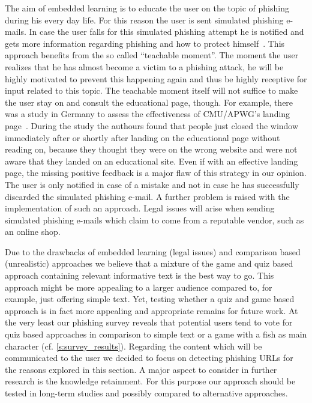 \begin{description}[leftmargin=0cm]
	\item[Emdedded Learning] The aim of embedded learning is to educate the user on the topic of phishing during his every day life.
 For this reason the user is sent simulated phishing e-mails.
 In case the user falls for this simulated phishing attempt he is notified and gets more information regarding phishing and how to protect himself~\cite{embedded2011jansson, kumaraguru2009phishguru}. 
This approach benefits from the so called ``teachable moment''. 
The moment the user realizes that he has almost become a victim to a phishing attack, he will be highly motivated to prevent this happening again and thus be highly receptive for input related to this topic.
 The teachable moment itself will not suffice to make the user stay on and consult the educational page, though.
 For example, there was a study in Germany to assess the effectiveness of CMU/APWG's landing page~\cite{TUD-CS-2013-0167}. 
 During the study the authours found that people just closed the window immediately after or shortly after landing on the educational page without reading on,  because they thought they were on the wrong website and were not aware that they landed on an educational site.
 Even if with an effective landing page, the missing positive feedback is a major flaw of this strategy in our opinion.
 The user is only notified in case of a mistake and not in case he has successfully discarded the simulated phishing e-mail.
 A further problem is raised with the implementation of such an approach.
 Legal issues will arise when sending simulated phishing e-mails which claim to come from a reputable vendor, such as an online shop.

\end{description}

Due to the drawbacks of embedded learning (legal issues) and comparison based (unrealistic) approaches we believe that a mixture of the game and quiz based approach containing relevant informative text is the best way to go.
This approach might be more appealing to a larger audience compared to, for example, just offering simple text.
Yet, testing whether a quiz and game based approach is in fact more appealing and appropriate remains for future work.
At the very least our phishing survey reveals that potential users tend to vote for quiz based approaches in comparison to simple text or a game with a fish as main character (cf. \autoref{s:survey_results}).
Regarding the content which will be communicated to the user we decided to focus on detecting phishing URLs for the reasons explored in this section.
A major aspect to consider in further research is the knowledge retainment.
For this purpose our approach should be tested in long-term studies and possibly compared to alternative approaches.